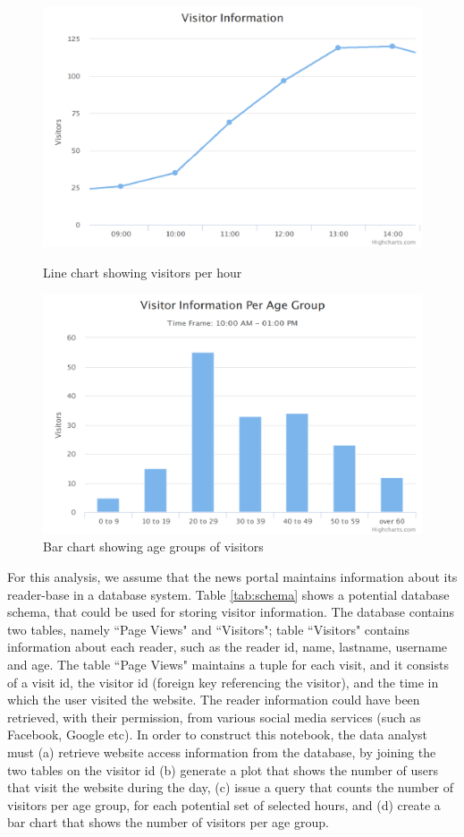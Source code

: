 \begin{figure}[ht]
  \centering
  \includegraphics[width=0.8\columnwidth]{figures/first-line.png}
  \caption{Line chart showing visitors per hour}
\label{figure:first-running-example:first-line-chart}
   \vspace*{0.1cm}
  \includegraphics[width=0.8\columnwidth]{figures/first-bar.png}
  \caption{Bar chart showing age groups of visitors}
  \label{figure:first-running-example:first-bar-chart}
\end{figure}



For this analysis, we assume that the news portal maintains information about its reader-base in a database system. Table \ref{tab:schema} shows a potential database schema, that could be used for storing visitor information. The database contains two tables, namely ``Page Views" and ``Visitors"; table ``Visitors" contains information about each reader, such as the reader id, name, lastname, username and age. The table ``Page Views" maintains a tuple for each visit, and it consists of a visit id, the visitor id (foreign key referencing the visitor), and the time in which the user visited the website. The reader information could have been retrieved, with their permission, from various social media services (such as Facebook, Google etc). In order to construct this notebook, the data analyst must (a) retrieve  website access information from the database, by joining the two tables on the visitor id (b) generate a plot that shows the number of users that visit the website during the day, (c) issue a query that counts the number of visitors per age group, for each potential set of selected hours, and (d) create a bar chart that shows the number of visitors per age group. 


